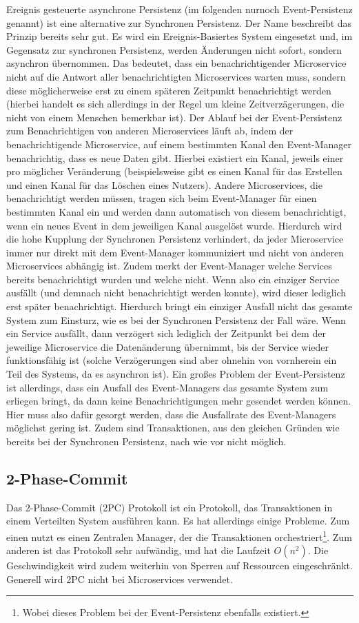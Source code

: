 Ereignis gesteuerte asynchrone Persistenz (im folgenden nurnoch Event-Persistenz genannt) ist eine alternative zur Synchronen Persistenz. Der Name beschreibt das Prinzip bereits sehr gut. Es wird ein Ereignis-Basiertes System eingesetzt und, im Gegensatz zur synchronen Persistenz, werden Änderungen nicht sofort, sondern asynchron übernommen. Das bedeutet, dass ein benachrichtigender Microservice nicht auf die Antwort aller benachrichtigten Microservices warten muss, sondern diese möglicherweise erst zu einem späteren Zeitpunkt benachrichtigt werden (hierbei handelt es sich allerdings in der Regel um kleine Zeitverzägerungen, die nicht von einem Menschen bemerkbar ist).
Der Ablauf bei der Event-Persistenz zum Benachrichtigen von anderen Microservices läuft ab, indem der benachrichtigende Microservice, auf einem bestimmten Kanal den Event-Manager benachrichtig, dass es neue Daten gibt. Hierbei existiert ein Kanal, jeweils einer pro möglicher Veränderung (beispielsweise gibt es einen Kanal für das Erstellen und einen Kanal für das Löschen eines Nutzers). Andere Microservices, die benachrichtigt werden müssen, tragen sich beim Event-Manager für einen bestimmten Kanal ein und werden dann automatisch von diesem benachrichtigt, wenn ein neues Event in dem jeweiligen Kanal ausgelöst wurde.
Hierdurch wird die hohe Kupplung der Synchronen Persistenz verhindert, da jeder Microservice immer nur direkt mit dem Event-Manager kommuniziert und nicht von anderen Microservices abhängig ist. Zudem merkt der Event-Manager welche Services bereits benachrichtigt wurden und welche nicht. Wenn also ein einziger Service ausfällt (und demnach nicht benachrichtigt werden konnte), wird dieser lediglich erst später benachrichtigt. Hierdurch bringt ein einziger Ausfall nicht das gesamte System zum Einsturz, wie es bei der Synchronen Persistenz der Fall wäre. Wenn ein Service ausfällt, dann verzögert sich lediglich der Zeitpunkt bei dem der jeweilige Microservice die Datenänderung übernimmt, bis der Service wieder funktionsfähig ist (solche Verzögerungen sind aber ohnehin von vornherein ein Teil des Systems, da es asynchron ist).
Ein großes Problem der Event-Persistenz ist allerdings, dass ein Ausfall des Event-Managers das gesamte System zum erliegen bringt, da dann keine Benachrichtigungen mehr gesendet werden können. Hier muss also dafür gesorgt werden, dass die Ausfallrate des Event-Managers möglichst gering ist. 
Zudem sind Transaktionen, aus den gleichen Gründen wie bereits bei der Synchronen Persistenz, nach wie vor nicht möglich.

\subsection{2-Phase-Commit}
Das 2-Phase-Commit (2PC) Protokoll ist ein Protokoll, das Transaktionen in einem Verteilten System ausführen kann. Es hat allerdings einige Probleme. Zum einen nutzt es einen Zentralen Manager, der die Transaktionen orchestriert\footnote{Wobei dieses Problem bei der Event-Persistenz ebenfalls existiert.}. Zum anderen ist das Protokoll sehr aufwändig, und hat die Laufzeit $O(n^2)$. Die Geschwindigkeit wird zudem weiterhin von Sperren auf Ressourcen eingeschränkt. Generell wird 2PC nicht bei Microservices verwendet.

